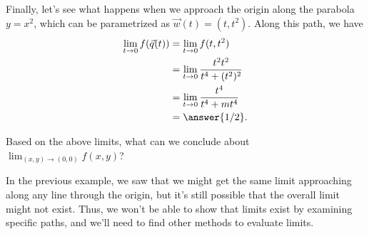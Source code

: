 \documentclass{ximera}
\begin{document}
\begin{example}
Finally, let's see what happens when we approach the origin along the parabola $y=x^2$, which can be parametrized as $\vec{w}(t) = (t, t^2)$. Along this path, we have
\begin{align*}
\lim_{t\rightarrow 0}f(\vec{q}(t)) &= \lim_{t\rightarrow 0}f(t,t^2)\\
&= \lim_{t\rightarrow 0}\frac{t^2 t^2}{t^4+(t^2)^2}\\
&= \lim_{t\rightarrow 0}\frac{t^4}{t^4+mt^4}\\
&= \answer{1/2}.
\end{align*}

Based on the above limits, what can we conclude about $\lim_{(x,y)\rightarrow (0,0)}f(x,y)$?
\begin{multipleChoice}
\end{multipleChoice}

\end{example}

In the previous example, we saw that we might get the same limit approaching along any line through the origin, but it's still possible that the overall limit might not exist. Thus, we won't be able to show that limits exist by examining specific paths, and we'll need to find other methods to evaluate limits.
\end{document}
